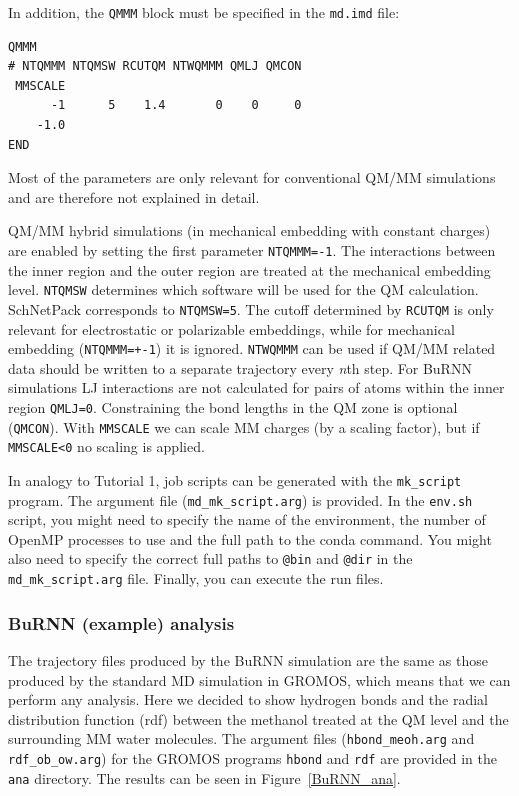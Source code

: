 In addition, the \texttt{QMMM} block must be specified in the \texttt{md.imd} file:
\begin{lstlisting}[breaklines=true, breakatwhitespace=false]
QMMM
# NTQMMM NTQMSW RCUTQM NTWQMMM QMLJ QMCON      
 MMSCALE
      -1      5    1.4       0    0     0
    -1.0
END
\end{lstlisting}

Most of the parameters are only relevant for conventional QM/MM simulations and are therefore not explained in detail.

QM/MM hybrid simulations (in mechanical embedding with constant charges) are enabled by setting the first parameter \texttt{NTQMMM=-1}. The interactions between the inner region and the outer region are treated at the mechanical embedding level. \texttt{NTQMSW} determines which software will be used for the QM calculation. SchNetPack corresponds to \texttt{NTQMSW=5}. The cutoff determined by \texttt{RCUTQM} is only relevant for electrostatic or polarizable embeddings, while for mechanical embedding (\texttt{NTQMMM=+-1}) it is ignored. \texttt{NTWQMMM} can be used if QM/MM related data should be written to a separate trajectory every \textit{n}th step. For BuRNN simulations LJ interactions are not calculated for pairs of atoms within the inner region \texttt{QMLJ=0}. Constraining the bond lengths in the QM zone is optional (\texttt{QMCON}). With \texttt{MMSCALE} we can scale MM charges (by a scaling factor), but if \texttt{MMSCALE<0} no scaling is applied.

In analogy to Tutorial 1, job scripts can be generated with the \texttt{mk\_script} program. The argument file (\texttt{md\_mk\_script.arg}) is provided. In the \texttt{env.sh} script, you might need to specify the name of the environment, the number of OpenMP processes to use and the full path to the conda command. You might also need to specify the correct full paths to \texttt{@bin} and \texttt{@dir} in the \texttt{md\_mk\_script.arg} file. Finally, you can execute the run files.


\subsubsection{BuRNN (example) analysis}
The trajectory files produced by the BuRNN simulation are the same as those produced by the standard MD simulation in GROMOS, which means that we can perform any analysis. Here we decided to show hydrogen bonds and the radial distribution function (rdf) between the methanol treated at the QM level and the surrounding MM water molecules. The argument files (\texttt{hbond\_meoh.arg} and \texttt{rdf\_ob\_ow.arg}) for the GROMOS programs \texttt{hbond} and \texttt{rdf} are provided in the \texttt{ana} directory. 
The results can be seen in Figure~\ref{BuRNN_ana}.

